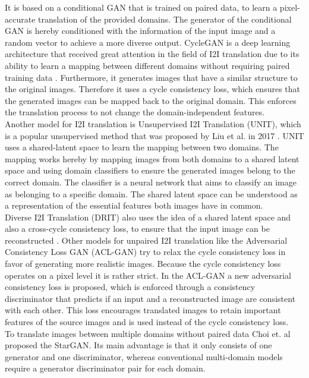 It is based on a conditional GAN that is trained on paired data, to learn a pixel-accurate translation of the provided domains.
The generator of the conditional GAN is hereby conditioned with the information of the input image and a random vector to achieve a more diverse output.
CycleGAN is a deep learning architecture that received great attention in the field of I2I translation due to its ability to learn a mapping between different domains without requiring paired training data \cite{Zhu2017}.
Furthermore, it generates images that have a similar structure to the original images.
Therefore it uses a cycle consistency loss, which ensures that the generated images can be mapped back to the original domain.
This enforces the translation process to not change the domain-independent features.\\
Another model for I2I translation is Unsupervised I2I Translation (UNIT), which is a popular unsupervised method that was proposed by Liu et al. in 2017 \cite{Liu2017}. 
UNIT uses a shared-latent space to learn the mapping between two domains.
The mapping works hereby by mapping images from both domains to a shared latent space and using domain classifiers to ensure the generated images belong to the correct domain.
The classifier is a neural network that aims to classify an image as belonging to a specific domain.
The shared latent space can be understood as a representation of the essential features both images have in common.\\
Diverse I2I Translation (DRIT) also uses the idea of a shared latent space and also a cross-cycle consistency loss, to ensure that the input image can be reconstructed \cite{lee2018diverse}.
Other models for unpaired I2I translation like the Adversarial Consistency Loss GAN (ACL-GAN) \cite{Zhao2020} try to relax the cycle consistency loss in favor of generating more realistic images.
Because the cycle consistency loss operates on a pixel level it is rather strict.
In the ACL-GAN a new adversarial consistency loss is proposed, which is enforced through a consistency discriminator that predicts if an input and a reconstructed image are consistent with each other.
This loss encourages translated images to retain important features of the source images and is used instead of the cycle consistency loss.\\
To translate images between multiple domains without paired data Choi et. al \cite*{choi2018stargan} proposed the StarGAN.
Its main advantage is that it only consists of one generator and one discriminator, whereas conventional multi-domain models require a generator discriminator pair for each domain.
